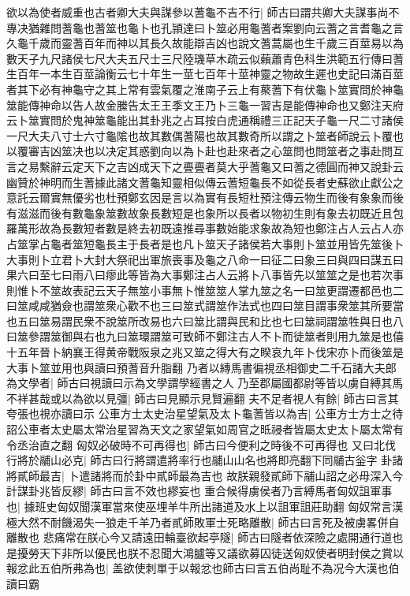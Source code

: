 欲以為使者威重也古者卿大夫與謀參以蓍龜不吉不行|{
	師古曰謂共卿大夫謀事尚不專决猶雜問蓍龜也蓍筮也龜卜也孔頴達曰卜筮必用龜蓍者案劉向云蓍之言耆龜之言久龜千歲而靈蓍百年而神以其長久故能辯吉凶也說文蓍蒿屬也生千歲三百莖易以為數天子九尺諸侯七尺大夫五尺士三尺陸璣草木疏云似藾蕭青色科生洪範五行傳曰蓍生百年一本生百莖論衡云七十年生一莖七百年十莖神靈之物故生遲也史記曰滿百莖者其下必有神龜守之其上常有雲氣覆之淮南子云上有藂蓍下有伏龜卜筮實問於神龜筮能傳神命以告人故金縢告太王王季文王乃卜三龜一習吉是能傳神命也又鄭注天府云卜筮實問於鬼神筮龜能出其卦兆之占耳按白虎通稱禮三正記天子龜一尺二寸諸侯一尺大夫八寸士六寸龜隂也故其數偶蓍陽也故其數奇所以謂之卜筮者師說云卜覆也以覆審吉凶筮决也以决定其惑劉向以為卜赴也赴來者之心筮問也問筮者之事赴問互言之易繫辭云定天下之吉凶成天下之亹亹者莫大乎蓍龜又曰蓍之德圓而神又說卦云幽贊於神明而生蓍據此諸文蓍龜知靈相似傳云蓍短龜長不如從長者史蘇欲止獻公之意託云爾實無優劣也杜預鄭玄因是言以為實有長短杜預注傳云物生而後有象象而後有滋滋而後有數龜象筮數故象長數短是也象所以長者以物初生則有象去初既近且包羅萬形故為長數短者數是終去初既遠推尋事數始能求象故為短也鄭注占人云占人亦占筮掌占龜者筮短龜長主于長者是也凡卜筮天子諸侯若大事則卜筮並用皆先筮後卜大事則卜立君卜大封大祭祀出軍旅喪事及龜之八命一曰征二曰象三曰與四曰謀五曰果六曰至七曰雨八曰瘳此等皆為大事鄭注占人云將卜八事皆先以筮筮之是也若次事則惟卜不筮故表記云天子無筮小事無卜惟筮筮人掌九筮之名一曰筮更謂遷都邑也二曰筮咸咸猶僉也謂筮衆心歡不也三曰筮式謂筮作法式也四曰筮目謂事衆筮其所要當也五曰筮易謂民衆不說筮所改易也六曰筮比謂與民和比也七曰筮祠謂筮牲與日也八曰筮參謂筮御與右也九曰筮環謂筮可致師不鄭注古人不卜而徒筮者則用九筮是也僖十五年晉卜納襄王得黄帝戰阪泉之兆又筮之得大有之睽哀九年卜伐宋亦卜而後筮是大事卜筮並用也與讀曰預蓍音升脂翻}
乃者以縳馬書徧視丞相御史二千石諸大夫郎為文學者|{
	師古曰視讀曰示為文學謂學經書之人}
乃至郡屬國都尉等皆以虜自縛其馬不祥甚哉或以為欲以見彊|{
	師古曰見顯示見賢遍翻}
夫不足者視人有餘|{
	師古曰言其夸張也視亦讀曰示}
公車方士太史治星望氣及太卜龜蓍皆以為吉|{
	公車方士方士之待詔公車者太史屬太常治星習為天文之家望氣如周官之㫝祲者皆屬太史太卜屬太常有令丞治直之翻}
匈奴必破時不可再得也|{
	師古曰今便利之時後不可再得也}
又曰北伐行將於鬴山必克|{
	師古曰行將謂遣將率行也鬴山山名也將即亮翻下同鬴古釡字}
卦諸將貳師最吉|{
	卜遣諸將而於卦中貳師最為吉也}
故朕親發貳師下鬴山詔之必毋深入今計謀卦兆皆反繆|{
	師古曰言不效也繆妄也}
重合候得虜侯者乃言縛馬者匈奴詛軍事也|{
	據班史匈奴聞漢軍當來使巫埋羊牛所出諸道及水上以詛軍詛莊助翻}
匈奴常言漢極大然不耐饑渴失一狼走千羊乃者貳師敗軍士死略離散|{
	師古曰言死及被虜畧併自離散也}
悲痛常在朕心今又請遠田輪臺欲起亭隧|{
	師古曰隧者依深險之處開通行道也}
是擾勞天下非所以優民也朕不忍聞大鴻臚等又議欲募囚徒送匈奴使者明封侯之賞以報忿此五伯所弗為也|{
	盖欲使刺單于以報忿也師古曰言五伯尚耻不為况今大漢也伯讀曰霸}
